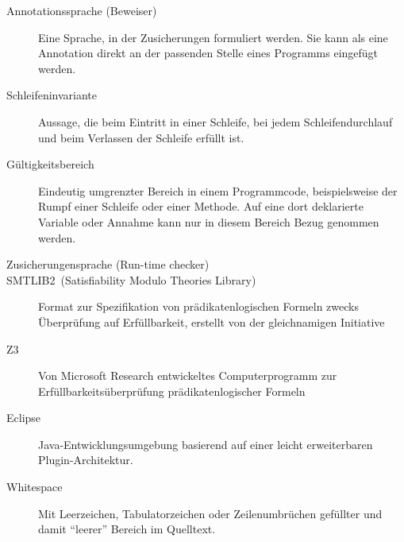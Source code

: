 \begin{description}
    \item[Annotationssprache (Beweiser)] Eine Sprache, in der \see Zusicherungen formuliert werden. Sie kann als eine Annotation direkt an der passenden Stelle eines Programms eingefügt werden.
    \item[Schleifeninvariante] Aussage, die beim Eintritt in einer Schleife, bei jedem Schleifendurchlauf und beim Verlassen der Schleife erfüllt ist.
    \item[Gültigkeitsbereich] Eindeutig umgrenzter Bereich in einem Programmcode, beispielsweise der Rumpf einer Schleife oder einer Methode. Auf eine dort deklarierte Variable oder Annahme kann nur in diesem Bereich Bezug genommen werden.
    \item[Zusicherungensprache (Run-time checker)]
    \item[SMTLIB2~(Satisfiability Modulo Theories Library)] Format zur Spezifikation von prädikatenlogischen Formeln zwecks Überprüfung auf Erfüllbarkeit, erstellt von der gleichnamigen Initiative
    \item[Z3] Von Microsoft Research entwickeltes Computerprogramm zur Erfüllbarkeitsüberprüfung prädikatenlogischer Formeln
    \item[Eclipse] Java-Entwicklungsumgebung basierend auf einer leicht erweiterbaren Plugin-Architektur.
    \item[Whitespace] Mit Leerzeichen, Tabulatorzeichen oder Zeilenumbrüchen gefüllter und damit "`leerer"' Bereich im Quelltext.
\end{description}

